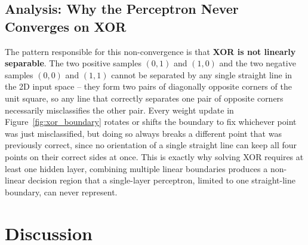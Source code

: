 \documentclass[11pt]{article}
\begin{document}
\subsection*{Analysis: Why the Perceptron Never Converges on XOR}
The pattern responsible for this non-convergence is that \textbf{XOR is not
linearly separable}. The two positive samples $(0,1)$ and $(1,0)$ and the two
negative samples $(0,0)$ and $(1,1)$ cannot be separated by any single
straight line in the 2D input space -- they form two pairs of diagonally
opposite corners of the unit square, so any line that correctly separates one
pair of opposite corners necessarily misclassifies the other pair. Every
weight update in Figure~\ref{fig:xor_boundary} rotates or shifts the boundary
to fix whichever point was just misclassified, but doing so always breaks a
different point that was previously correct, since no orientation of a single
straight line can keep all four points on their correct sides at once. This
is exactly why solving XOR requires at least one hidden layer, combining multiple linear boundaries
produces a non-linear decision region that a single-layer perceptron, limited
to one straight-line boundary, can never represent.

\section{Discussion}
\end{document}
